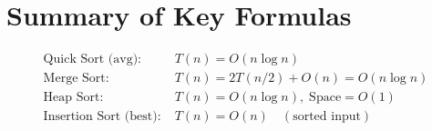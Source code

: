 \documentclass[12pt,a4paper]{article}
\begin{document}
\section{Summary of Key Formulas}

\begin{align}
\text{Quick Sort (avg):}\quad & T(n) = O(n \log n) \\
\text{Merge Sort:}\quad        & T(n) = 2T(n/2) + O(n) = O(n \log n) \\
\text{Heap Sort:}\quad         & T(n) = O(n \log n),\; \text{Space} = O(1) \\
\text{Insertion Sort (best):}\; & T(n) = O(n) \quad (\text{sorted input})
\end{align}
\end{document}
